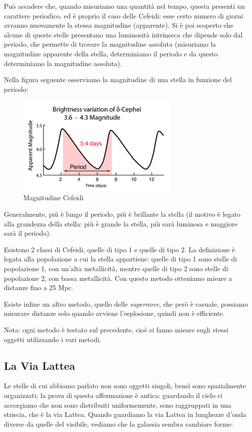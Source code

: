 Può accadere che, quando misuriamo una quantità nel tempo, questa presenti un carattere periodico, ed è proprio il caso delle Cefeidi: esse certo numero di giorni avranno nuovamente la stessa magnitudine (apparente). Si è poi scoperto che alcune di queste stelle presentano una luminosità intrinseca che dipende solo dal periodo, che permette di trovare la magnitudine assoluta (misuriamo la magnitudine apparente della stella, determiniamo il periodo e da questo determiniamo la magnitudine assoluta).

Nella figura seguente osserviamo la magnitudine di una stella in funzione del periodo:

\begin{figure}[H]
    \centering
    \includegraphics[width=8cm]{Magnitudine Cefeidi.JPG}
    \caption{Magnitudine Cefeidi}
\end{figure}

Generalmente, più è lungo il periodo, più è brillante la stella (il motivo è legato alla grandezza della stella: più è grande la stella, più sarà luminosa e maggiore sarà il periodo).

Esistono 2 classi di Cefeidi, quelle di tipo 1 e quelle di tipo 2. La definizione è legata alla popolazione a cui la stella appartiene: quelle di tipo 1 sono stelle di popolazione 1, con un'alta metallicità, mentre quelle di tipo 2 sono stelle di popolazione 2, con bassa metallicità. Con questo metodo otteniamo misure a distanze fino a 25 Mpc.

Esiste infine un altro metodo, quello delle \textit{supernove}, che però è casuale, possiamo misurare distanze solo quando avviene l'esplosione, quindi non è efficiente.

Nota: ogni metodo è testato sul precedente, cioè si fanno misure sugli stessi oggetti utilizzando i vari metodi.

\subsection{La Via Lattea}
Le stelle di cui abbiamo parlato non sono oggetti singoli, bensì sono spazialmente organizzati; la prova di questa affermazione è antica: guardando il cielo ci accorgiamo che non sono distribuiti uniformemente, sono raggruppati in una striscia, che è la via Lattea. Quando guardiamo la via Lattea in lunghezze d'onda diverse da quelle del visibile, vediamo che la galassia sembra cambiare forme:

